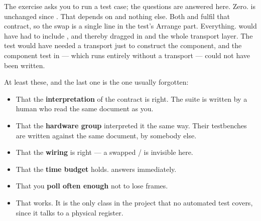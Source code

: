 The exercise asks you to run a test case; the questions are answered here.
 Zero.  is unchanged since .
 That  depends on  and nothing else. Both
 and  fulfil that contract, so the swap is a single line in the test's
Arrange part.
 Everything.  would have had to include , and thereby dragged in
 and the whole transport layer. The test would have needed a transport just to
construct the component, and the component test in  --- which runs entirely
without a transport --- could not have been written.

At least these, and the last one is the one usually forgotten:

\begin{itemize}
  \item That the \textbf{interpretation} of the contract is right. The suite is written by a human
    who read the same document as you.
  \item That the \textbf{hardware group} interpreted it the same way. Their testbenches are
    written against the same document, by somebody else.
  \item That the \textbf{wiring} is right --- a swapped / is invisible here.
  \item That the \textbf{time budget} holds.  answers immediately.
  \item That you \textbf{poll often enough} not to lose frames.
  \item That  works. It is the only class in the project that no automated
    test covers, since it talks to a physical register.
\end{itemize}
